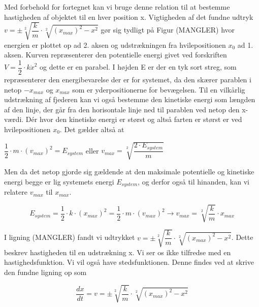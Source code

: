 Med forbehold for fortegnet kan vi bruge denne relation til at bestemme hastigheden af objektet til en hver position x. Vigtigheden af det fundne udtryk $v = \pm \sqrt[2]{\dfrac{k}{m}} \cdot \sqrt[2]{(x_{max})^2-x^2}$ gør sig tydligt på Figur (MANGLER) hvor energien er plottet op ad 2. aksen og udstrækningen fra hvilepositionen $x_0$ ad 1. aksen. Kurven repræsenterer den potentielle energi givet ved forskriften $V=\dfrac{1}{2} \cdot k \dot x^2$ og dette er en parabel. I højden E er der en tyk sort streg, som repræsenterer den energibevarelse der er for systemet, da den skærer parablen i netop $-x_{max}$ og $x_{max}$ som er yderpositionerne for bevægelsen. Til en vilkårlig udstrækning af fjederen kan vi også bestemme den kinetiske energi som længden af den linje, der går fra den horisontale linje ned til parablen ved netop den x-værdi. Dér hvor den kinetiske energi er størst og altså farten er størst er ved hvilepositionen $x_0$. Det gælder altså at



\bigskip
\begin{center}
$\dfrac{1}{2} \cdot m \cdot (v_{max})^2 = E_{system}$ eller $v_{max} = \sqrt[2]{\dfrac{2 \cdot E_{system}}{m}}$
\end{center}
\bigskip

Men da det netop gjorde sig gældende at den maksimale potentielle og kinetiske energi begge er lig systemets energi $E_{system}$, og derfor også til hinanden, kan vi relatere $v_{max}$ til $x_{max}$.

\begin{center}
\begin{equation}
E_{system} = \dfrac{1}{2} \cdot k \cdot (x_{max})^2 = \dfrac{1}{2} \cdot m \cdot (v_{max})^2 \rightarrow v_{max} = \sqrt[2]{\dfrac{k}{m}} \cdot x_{max}
\end{equation}
\end{center}

I ligning (MANGLER) fandt vi udtrykket $v = \pm \sqrt[2]{\dfrac{k}{m}} \cdot \sqrt[2]{(x_{max})^2-x^2}$. Dette beskrev hastigheden til en udstrækning x. Vi ser os ikke tilfredse med en hastighedsfunktion. Vi vil også have stedsfunktionen. Denne findes ved at skrive den fundne ligning op som 

\begin{center}
\begin{equation}
\dfrac{dx}{dt} = v = \pm \sqrt[2]{\dfrac{k}{m}} \cdot \sqrt[2]{(x_{max})^2-x^2}
\end{equation}
\end{center}

